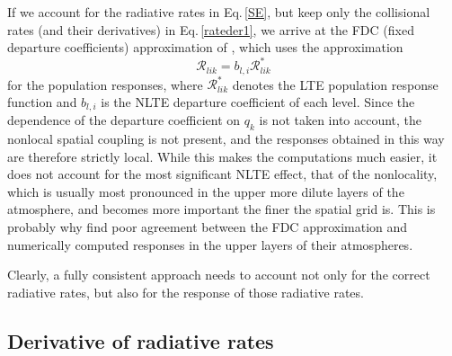 \documentclass[referee]{aa}
\begin{document}
If we account for the radiative rates in Eq.\,\ref{SE}, but keep only the collisional rates (and their derivatives) in Eq.\,\ref{rateder1}, we arrive at the FDC (fixed departure coefficients) approximation of \citet{HectorI}, which uses the approximation
\begin{equation}
{\mathcal R}_{lik} = b_{l,i}  {\mathcal R}^*_{lik}
\end{equation}
for the population responses, where ${\mathcal R}^*_{lik}$ denotes the LTE population response function and $b_{l,i}$ is the  NLTE departure coefficient of each level. Since the dependence of the departure coefficient on $q_k$ is not taken into account, the nonlocal spatial coupling is not present, and the responses obtained in this way are therefore strictly local. While this makes the computations much easier, it does not account for the most significant NLTE effect, that of the nonlocality, which is usually most pronounced in the upper more dilute layers of the atmosphere, and becomes more important the finer the spatial grid is. This is probably why \citet{HectorI} find poor agreement between the FDC approximation and numerically computed responses in the upper layers of their atmospheres.

Clearly, a fully consistent approach needs to account not only for the correct radiative rates, but also for the response of those radiative rates.

\subsection{Derivative of radiative rates}
\label{radiative_rates}
\end{document}
